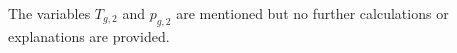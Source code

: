The variables \( T_{g,2} \) and \( p_{g,2} \) are mentioned but no further calculations or explanations are provided.
